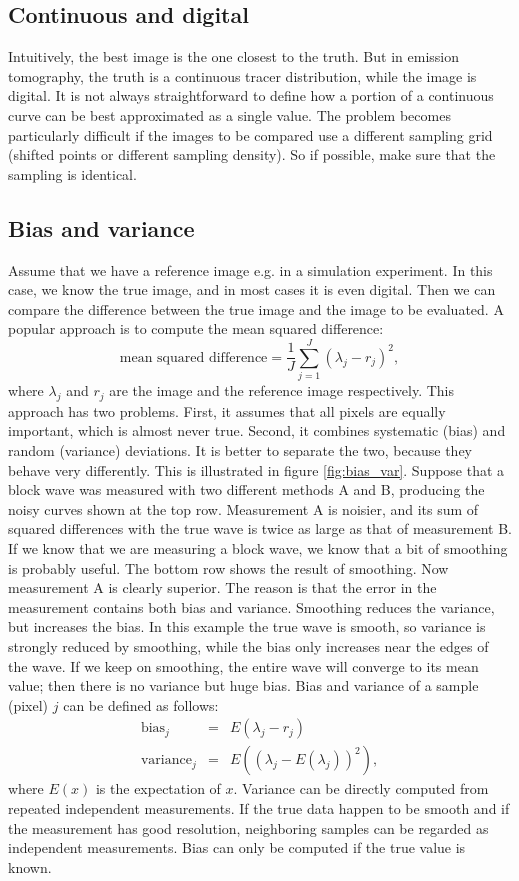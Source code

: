 \subsection{Continuous and digital}
Intuitively, the best image is the one closest to the truth. But in emission
tomography, the truth is a continuous tracer distribution, while the image is
digital. It is not always straightforward to define how a portion of a
continuous curve can be best approximated as a single value. The problem
becomes particularly difficult if the images to be compared use a different
sampling grid (shifted points or different sampling density). So if possible,
make sure that the sampling is identical.

\subsection{Bias and variance}
Assume that we have a reference image e.g. in a simulation experiment. In
this case, we know the true image, and in most cases it is even digital. Then
we can compare the difference between the true image and the image to be
evaluated. A popular approach is to compute the mean squared difference:
\begin{equation}
  \mbox{mean squared difference} = \frac{1}{J} \sum_{j=1}^J (\lambda_j - r_j)^2,
\end{equation}
where $\lambda_j$ and $r_j$ are the image and the reference image
respectively.  This approach has two problems. First, it assumes that
all pixels are equally important, which is almost never true. Second,
it combines systematic (bias) and random (variance) deviations. It is
better to separate the two, because they behave very differently. This
is illustrated in figure \ref{fig:bias_var}. Suppose that a block wave
was measured with two different methods A and B, producing the noisy
curves shown at the top row. Measurement A is noisier, and its sum of
squared differences with the true wave is twice as large as that of
measurement B. If we know that we are measuring a block wave, we know
that a bit of smoothing is probably useful. The bottom row shows the
result of smoothing. Now measurement A is clearly superior. The reason
is that the error in the measurement contains both bias and
variance. Smoothing reduces the variance, but increases the bias. In
this example the true wave is smooth, so variance is strongly reduced
by smoothing, while the bias only increases near the edges of the
wave.  If we keep on smoothing, the entire wave will converge to its
mean value; then there is no variance but huge bias. Bias and variance
of a sample (pixel) $j$ can be defined as follows:
\begin{eqnarray}
  \mbox{bias}_j     & = & E(\lambda_j - r_j)\\
  \mbox{variance}_j & = & E\left((\lambda_j - E(\lambda_j))^2 \right),
\end{eqnarray}
where $E(x)$ is the expectation of $x$. Variance can be directly computed from
repeated independent measurements. If the true data happen to be smooth and if
the measurement has good resolution, neighboring samples can be regarded as
independent measurements. Bias can only be computed if the true value is known.

